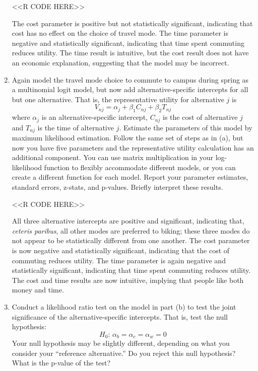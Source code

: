 \documentclass[11pt,letterpaper]{article}
\begin{document}
\begin{enumerate}[label=\alph*., leftmargin=*]
	<<R CODE HERE>>
	
	The cost parameter is positive but not statistically significant, indicating that cost has no effect on the choice of travel mode. The time parameter is negative and statistically significant, indicating that time spent commuting reduces utility. The time result is intuitive, but the cost result does not have an economic explanation, suggesting that the model may be incorrect.

	\item Again model the travel mode choice to commute to campus during spring as a multinomial logit model, but now add alternative-specific intercepts for all but one alternative. That is, the representative utility for alternative $j$ is
	$$V_{nj} = \alpha_j + \beta_1 C_{nj} + \beta_2 T_{nj}$$
	where $\alpha_j$ is an alternative-specific intercept, $C_{nj}$ is the cost of alternative $j$ and $T_{nj}$ is the time of alternative $j$. Estimate the parameters of this model by maximum likelihood estimation. Follow the same set of steps as in (a), but now you have five parameters and the representative utility calculation has an additional component. You can use matrix multiplication in your log-likelihood function to flexibly accommodate different models, or you can create a different function for each model. Report your parameter estimates, standard errors, z-stats, and p-values. Briefly interpret these results.

	<<R CODE HERE>>

	All three alternative intercepts are positive and significant, indicating that, \emph{ceteris paribus}, all other modes are preferred to biking; these three modes do not appear to be statistically different from one another. The cost parameter is now negative and statistically significant, indicating that the cost of commuting reduces utility. The time parameter is again negative and statistically significant, indicating that time spent commuting reduces utility. The cost and time results are now intuitive, implying that people like both money and time.
	
	\item Conduct a likelihood ratio test on the model in part (b) to test the joint significance of the alternative-specific intercepts. That is, test the null hypothesis:
	$$H_0 \text{: } \alpha_b = \alpha_c = \alpha_w = 0$$
	Your null hypothesis may be slightly different, depending on what you consider your ``reference alternative.'' Do you reject this null hypothesis? What is the p-value of the test?


\end{enumerate}
\end{document}
